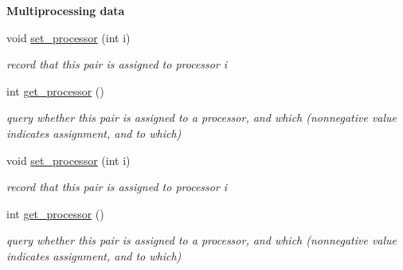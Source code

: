 \begin{Indent}\textbf{ Multiprocessing data}\par
\begin{DoxyCompactItemize}
\item 
\mbox{\label{class_critical___pair___x_plor_a4c0085660583e247f354735ee900f2d3}} 
void \hyperlink{class_critical___pair___x_plor_a4c0085660583e247f354735ee900f2d3}{set\+\_\+processor} (int i)
\begin{DoxyCompactList}\small\item\em record that this pair is assigned to processor {\ttfamily i} \end{DoxyCompactList}\item 
\mbox{\label{class_critical___pair___x_plor_a1f07b8a991c138ad6c8de5deeb64ece6}} 
int \hyperlink{class_critical___pair___x_plor_a1f07b8a991c138ad6c8de5deeb64ece6}{get\+\_\+processor} ()
\begin{DoxyCompactList}\small\item\em query whether this pair is assigned to a processor, and which (nonnegative value indicates assignment, and to which) \end{DoxyCompactList}\item 
\mbox{\label{class_critical___pair___x_plor_a4c0085660583e247f354735ee900f2d3}} 
void \hyperlink{class_critical___pair___x_plor_a4c0085660583e247f354735ee900f2d3}{set\+\_\+processor} (int i)
\begin{DoxyCompactList}\small\item\em record that this pair is assigned to processor {\ttfamily i} \end{DoxyCompactList}\item 
\mbox{\label{class_critical___pair___x_plor_a1f07b8a991c138ad6c8de5deeb64ece6}} 
int \hyperlink{class_critical___pair___x_plor_a1f07b8a991c138ad6c8de5deeb64ece6}{get\+\_\+processor} ()
\begin{DoxyCompactList}\small\item\em query whether this pair is assigned to a processor, and which (nonnegative value indicates assignment, and to which) \end{DoxyCompactList}\item 
\mbox{\label{class_critical___pair___x_plor_a4c0085660583e247f354735ee900f2d3}} 

\end{DoxyCompactItemize}
\end{Indent}
